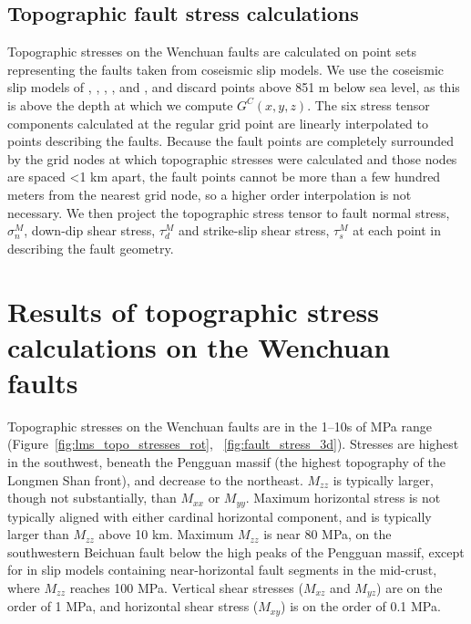 \documentclass[twocolumn,jgrga]{AGUTeX}
\begin{document}
\begin{article}
\subsection{Topographic fault stress
calculations}\label{topographic-fault-stress-calculations}

Topographic stresses on the Wenchuan faults are calculated on point sets
representing the faults taken from coseismic slip models. We use the
coseismic slip models of \citet{shen2009},
\citet{feng2010}, \citet{qi2011}, \citet{zhang2011},
and \citet{fielding2013}, and discard
points above 851 m below sea level, as this is above the depth at which
we compute $G^C(x,y,z)$. The six stress tensor components calculated at
the regular grid point are linearly interpolated to points describing
the faults. Because the fault points are completely surrounded by the
grid nodes at which topographic stresses were calculated and those nodes
are spaced \textless{}1 km apart, the fault points cannot be more than a
few hundred meters from the nearest grid node, so a higher order
interpolation is not necessary. We then project the topographic stress
tensor to fault normal stress, $\sigma_n^M$, down-dip shear stress,
$\tau_d^M$ and strike-slip shear stress, $\tau_s^M$ at each point in
describing the fault geometry.

\section{Results of topographic stress calculations on the Wenchuan
faults}\label{results-of-topographic-stress-calculations-on-the-wenchuan-faults}

Topographic stresses on the Wenchuan faults are in the 1--10s of MPa
range (Figure~\ref{fig:lms_topo_stresses_rot}, ~\ref{fig:fault_stress_3d}). 
Stresses are highest in the southwest,
beneath the Pengguan massif (the highest topography of the Longmen Shan
front), and decrease to the northeast. $M_{zz}$ is typically larger,
though not substantially, than $M_{xx}$ or $M_{yy}$. Maximum horizontal
stress is not typically aligned with either cardinal horizontal
component, and is typically larger than $M_{zz}$ above 10 km. Maximum
$M_{zz}$ is near 80 MPa, on the southwestern Beichuan fault below the
high peaks of the Pengguan massif, except for in slip models containing
near-horizontal fault segments in the mid-crust, where $M_{zz}$ reaches
100 MPa. Vertical shear stresses ($M_{xz}$ and $M_{yz}$) are on the
order of 1 MPa, and horizontal shear stress ($M_{xy}$) is on the order
of 0.1 MPa.


\end{article}
\end{document}
